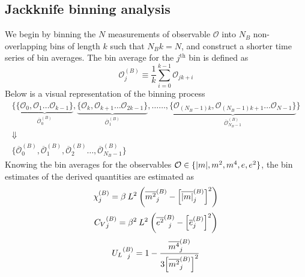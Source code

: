 \documentclass[../thesis_main.tex]{subfiles}
\begin{document}
\subsection{Jackknife binning analysis}
We begin by binning the $N$ measurements of observable $\mathcal{O}$ into $N_B$ non-overlapping bins of length $k$ such that $N_B k = N$, and construct a shorter time series of bin averages. The bin average for the $j^\text{th}$ bin is defined as
\begin{equation}
    \mathcal{O}^{(B)}_j \equiv \frac{1}{k} \sum_{i = 0}^{k-1} \mathcal{O}_{jk+i} 
\end{equation}
Below is a visual representation of the binning process 
\begin{gather*}
    \{\underbrace{\{\mathcal{O}_0, \mathcal{O}_1 \ldots \mathcal{O}_{k-1}\}}_{\overline{\mathcal{O}}^{(B)}_0}, \underbrace{\{\mathcal{O}_{k}, \mathcal{O}_{k+1} \ldots \mathcal{O}_{2k-1}\}}_{\overline{\mathcal{O}}^{(B)}_1}, \ldots\ldots ,\underbrace{\{\mathcal{O}_{(N_B-1)k}, \mathcal{O}_{(N_B-1)k+1} \ldots \mathcal{O}_{N-1}\}}_{\overline{\mathcal{O}}^{(B)}_{N_B-1}}\} \\
    \Downarrow \\
    \{
        \overline{\mathcal{O}}^{(B)}_0, \overline{\mathcal{O}}^{(B)}_1, \overline{\mathcal{O}}^{(B)}_2 \ldots ,\overline{\mathcal{O}}^{(B)}_{N_B-1} 
    \}
\end{gather*}
Knowing the bin averages for the observables $\mathcal{O} \in \{\abs{m}, m^2, m^4, e, e^2 \}$, the bin estimates of the derived quantities are estimated as
\begin{equation}
    \chi^{(B)}_j = \beta \: L^2\:\qty(\overline{m^2}^{(B)}_j - \qty[\overline{|m|}^{(B)}_j]^2)
\end{equation}
\begin{equation}
    {C_V}^{(B)}_j = \beta ^2\: L^2 \:\qty(\overline{e^2}^{(B)}_{\:\:\:j} - \qty[\overline{e}^{(B)}_j]^2)
\end{equation}
\begin{equation}
    {U_L}^{(B)}_{\:\:\:j} = 1 - \frac{\overline{m^4}^{(B)}_j}{3\qty[\overline{m^2}^{(B)}_j]^2}
\end{equation}
\end{document}
